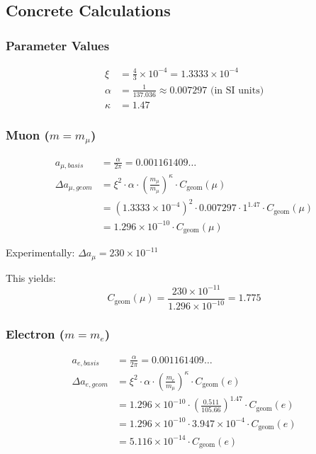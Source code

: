 \documentclass[12pt,a4paper]{article}
\numberwithin{equation}{section}
\newcommand{\xipar}{\xi}
\newcommand{\Cgeom}{C_{\text{geom}}}
\newcommand{\kappaT}{\kappa}
\newcommand{\mmu}{m_{\mu}}
\newcommand{\melec}{m_{e}}
\begin{document}
	\subsection{Concrete Calculations}
	
	\subsubsection{Parameter Values}
	
	\begin{align}
		\xipar &= \frac{4}{3} \times 10^{-4} = 1.3333 \times 10^{-4}\\
		\alpha &= \frac{1}{137.036} \approx 0.007297 \text{ (in SI units)}\\
		\kappaT &= 1.47
	\end{align}
	
	\subsubsection{Muon ($m = \mmu$)}
	
	\begin{align}
		a_{\mu,basis} &= \frac{\alpha}{2\pi} = 0.001161409\ldots\\
		\Delta a_{\mu,geom} &= \xipar^2 \cdot \alpha \cdot \left(\frac{\mmu}{\mmu}\right)^\kappaT \cdot \Cgeom(\mu)\\
		&= (1.3333 \times 10^{-4})^2 \cdot 0.007297 \cdot 1^{1.47} \cdot \Cgeom(\mu)\\
		&= 1.296 \times 10^{-10} \cdot \Cgeom(\mu)
	\end{align}
	
	Experimentally: $\Delta a_\mu = 230 \times 10^{-11}$
	
	This yields:
	\begin{equation}
		\Cgeom(\mu) = \frac{230 \times 10^{-11}}{1.296 \times 10^{-10}} = 1.775
	\end{equation}
	
	\subsubsection{Electron ($m = \melec$)}
	
	\begin{align}
		a_{e,basis} &= \frac{\alpha}{2\pi} = 0.001161409\ldots\\
		\Delta a_{e,geom} &= \xipar^2 \cdot \alpha \cdot \left(\frac{\melec}{\mmu}\right)^\kappaT \cdot \Cgeom(e)\\
		&= 1.296 \times 10^{-10} \cdot \left(\frac{0.511}{105.66}\right)^{1.47} \cdot \Cgeom(e)\\
		&= 1.296 \times 10^{-10} \cdot 3.947 \times 10^{-4} \cdot \Cgeom(e)\\
		&= 5.116 \times 10^{-14} \cdot \Cgeom(e)
	\end{align}
	
\end{document}
